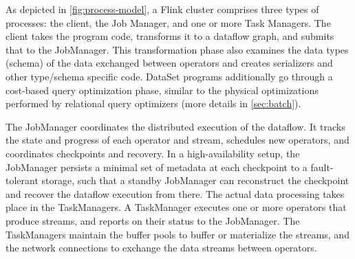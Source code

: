\documentclass[11pt]{article}
\begin{document}
As depicted in \autoref{fig:process-model}, a Flink cluster comprises three types of processes: the client, the Job Manager, and one or more Task Managers. The client takes the program code, transforms it to a dataflow graph, and submits that to the JobManager. This transformation phase also examines the data types (schema) of the data exchanged between operators and creates serializers and other type/schema specific code. DataSet programs additionally go through a cost-based query optimization phase, similar to the physical optimizations performed by relational query optimizers (more details in \autoref{sec:batch}).

The JobManager coordinates the distributed execution of the dataflow. It tracks the state and progress of each operator and stream, schedules new operators, and coordinates checkpoints and recovery. In a high-availability setup, the JobManager persists a minimal set of metadata at each checkpoint to a fault-tolerant storage, such that a standby JobManager can reconstruct the checkpoint and recover the dataflow execution from there. The actual data processing takes place in the TaskManagers. A TaskManager executes one or more operators that produce streams, and reports on their status to the JobManager. The TaskManagers maintain the buffer pools to buffer or materialize the streams, and the network connections to exchange the data streams between operators.
\end{document}
